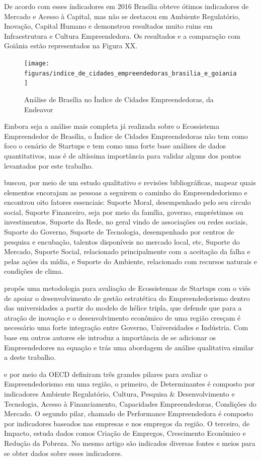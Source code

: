 De acordo com esses índicadores em 2016 Brasília obteve ótimos indicadores de Mercado e Acesso à Capital, mas não se destacou em Ambiente Regulatório, Inovação, Capital Humano e demonstrou resultados muito ruins em Infraestrutura e Cultura Empreendedora. Os resultados e a comparação com Goiânia estão representados na Figura XX.

\begin{figure}[!htb]
\centering
\texttt{[image: figuras/indice\_de\_cidades\_empreendedoras\_brasilia\_e\_goiania]}
\caption{Análise de Brasília no Índice de Cidades Empreendedoras, da Endeavor}
\label{Rotulo}
\end{figure}

Embora seja a análise mais completa já realizada sobre o Ecossistema Empreendedor de Brasília, o Índice de Cidades Empreendedoras não tem como foco o cenário de Startups e tem como uma forte base análises de dados quantitativos, mas é de altíssima importância para validar alguns dos pontos levantados por este trabalho.

 buscou, por meio de um estudo qualitativo e revisões bibliográficas, mapear quais elementos encorajam as pessoas a seguirem o caminho do Empreendedorismo e encontrou oito fatores essenciais: Suporte Moral, desempenhado pelo seu circulo social, Suporte Financeiro, seja por meio da família, governo, empréstimos ou investimentos, Suporte da Rede, no geral vindo de associações ou redes sociais, Suporte do Governo, Suporte de Tecnologia, desempenhado por centros de pesquisa e encubação, talentos disponíveis no mercado local, etc, Suporte do Mercado, Suporte Social, relacionado principalmente com a aceitação da falha e pelas ações da mídia, e Suporte do Ambiente, relacionado com recursos naturais e condições de clima.

 propôs uma metodologia para avaliação de Ecossistemas de Startups com o viés de apoiar o desenvolvimento de gestão estratética do Empreendedorismo dentro das universidades a partir do modelo de hélice tripla, que defende que para a atração de inovação e o desenvolvimento econômico de uma região cresçam é necessário uma forte integração entre Governo, Universidades e Indústria. Com base em outros autores ele introduz a importância de se adicionar os Empreendedores na equação e trás uma abordagem de análise qualitativa similar a deste trabalho.

 e  por meio da OECD definiram três grandes pilares para avaliar o Empreendedorismo em uma região, o primeiro, de Determinantes é composto por indicadores Ambiente Regulatório, Cultura, Pesquisa \& Desenvolvimento e Tecnologia, Acesso à Financiamento, Capacidades Empreendedoras, Condições do Mercado. O segundo pilar, chamado de Performance Empreendedora é composto por indicadores baseados nas empresas e nos empregos da região. O terceiro, de Impacto, estuda dados comos Criação de Empregos, Crescimento Econômico e Redução da Pobreza. No mesmo artigo são indicados diversas fontes e meios para se obter dados sobre esses indicadores.

